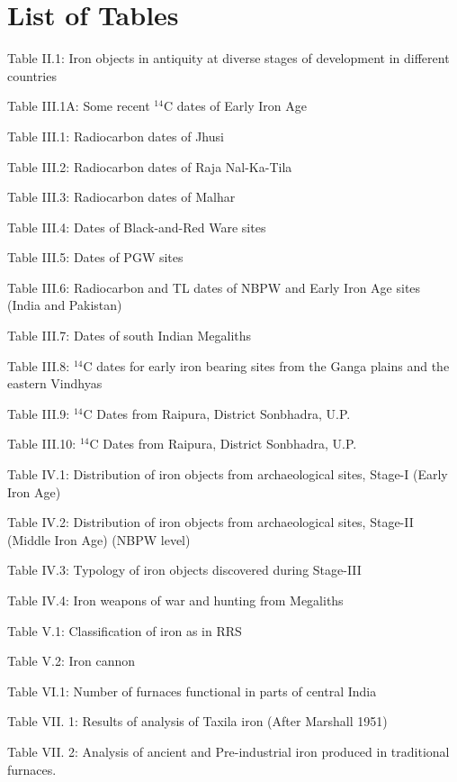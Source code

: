 \chapter*{List of Tables}\label{table}

Table II.1:	Iron objects in antiquity at diverse stages of development in different countries 

Table III.1A:	Some recent $^{14}$C dates of Early Iron Age

Table III.1:	Radiocarbon dates of Jhusi

Table III.2:	Radiocarbon dates of Raja Nal-Ka-Tila

Table III.3:	Radiocarbon dates of Malhar

Table III.4:	Dates of Black-and-Red Ware sites 

Table III.5:	Dates of PGW sites 

Table III.6:	Radiocarbon and TL dates of NBPW and Early Iron Age sites\\ (India and Pakistan)

Table III.7:	Dates of south Indian Megaliths 

Table III.8:	$^{14}$C dates for early iron bearing sites from the Ganga plains and the eastern Vindhyas

Table III.9:  $^{14}$C Dates from Raipura, District Sonbhadra, U.P.

Table III.10:  $^{14}$C Dates from Raipura, District Sonbhadra, U.P.

Table IV.1:	Distribution of iron objects from archaeological sites, Stage-I (Early Iron Age)

Table IV.2:	Distribution of iron objects from archaeological sites, Stage-II (Middle Iron Age) (NBPW level)

Table IV.3:	Typology of iron objects discovered during Stage-III

Table IV.4:	Iron weapons of war and hunting from Megaliths

Table V.1: Classification of iron as in RRS

Table V.2: Iron cannon

Table VI.1: Number of furnaces functional in parts of central India

Table VII. 1: Results of analysis of Taxila iron (After Marshall 1951)

Table VII. 2: Analysis of ancient and Pre-industrial iron produced in traditional furnaces.
